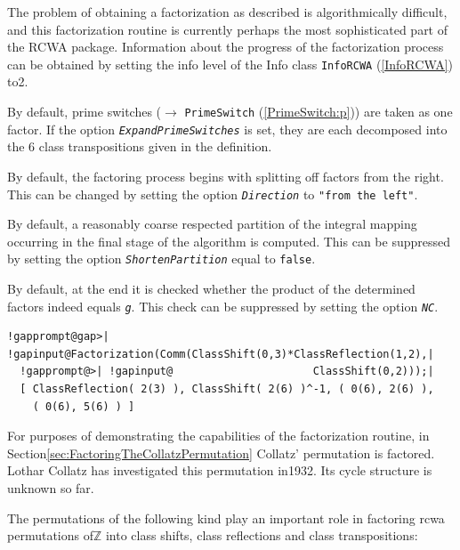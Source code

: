 \documentclass[a4paper,11pt]{report}
\begin{document}
{{{ The problem of obtaining a factorization as described is algorithmically
difficult, and this factorization routine is currently perhaps the most
sophisticated part of the \textsf{RCWA} package. Information about the progress of the factorization process can be
obtained by setting the info level of the Info class \texttt{InfoRCWA} (\ref{InfoRCWA}) to{\nobreakspace}2. 

 By default, prime switches ($\rightarrow$ \texttt{PrimeSwitch} (\ref{PrimeSwitch:p})) are taken as one factor. If the option \mbox{\texttt{\mdseries\slshape ExpandPrimeSwitches}} is set, they are each decomposed into the 6 class transpositions given in the
definition. 

 By default, the factoring process begins with splitting off factors from the
right. This can be changed by setting the option \mbox{\texttt{\mdseries\slshape Direction}} to \texttt{"from the left"}. 

 By default, a reasonably coarse respected partition of the integral mapping
occurring in the final stage of the algorithm is computed. This can be
suppressed by setting the option \mbox{\texttt{\mdseries\slshape ShortenPartition}} equal to \texttt{false}. 

 By default, at the end it is checked whether the product of the determined
factors indeed equals \mbox{\texttt{\mdseries\slshape g}}. This check can be suppressed by setting the option \mbox{\texttt{\mdseries\slshape NC}}. 
\begin{Verbatim}[commandchars=!@|,fontsize=\small,frame=single,label=Example]
  !gapprompt@gap>| !gapinput@Factorization(Comm(ClassShift(0,3)*ClassReflection(1,2),|
  !gapprompt@>| !gapinput@                      ClassShift(0,2)));|
  [ ClassReflection( 2(3) ), ClassShift( 2(6) )^-1, ( 0(6), 2(6) ), 
    ( 0(6), 5(6) ) ]
\end{Verbatim}
 }

 For purposes of demonstrating the capabilities of the factorization routine,
in Section{\nobreakspace}\ref{sec:FactoringTheCollatzPermutation} Collatz' permutation is factored. Lothar Collatz has investigated this
permutation in{\nobreakspace}1932. Its cycle structure is unknown so far. 

 The permutations of the following kind play an important role in factoring
rcwa permutations of{\nobreakspace}{\ensuremath{\mathbb Z}} into class shifts,
class reflections and class transpositions: 

}}
\end{document}
